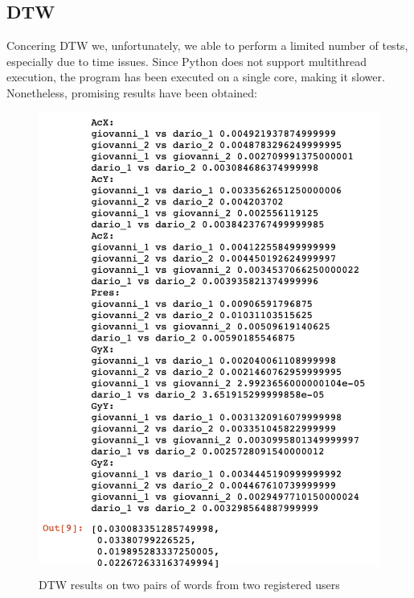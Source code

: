 \documentclass[8pt,notitlepage]{report}
\begin{document}
		\subsection{DTW}
			Concering DTW we, unfortunately, we able to perform a limited number of tests, especially due to time issues. Since Python does not support multithread execution, the program has been executed on a single core, making it slower. \\
			Nonetheless, promising results have been obtained:
				\begin{figure}[H]
					\begin{center}
						\includegraphics[scale=.25]{dtw_test}
						\caption{DTW results on two pairs of words from two registered users}
					\end{center}
				\end{figure}	
				
\end{document}
